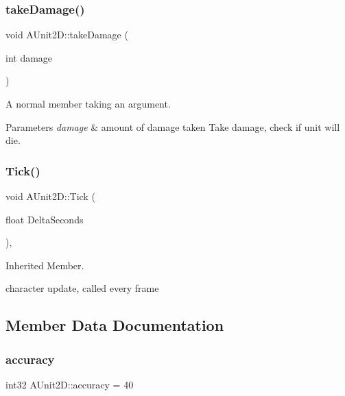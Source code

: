 \subsubsection{\texorpdfstring{take\+Damage()}{takeDamage()}}
{\footnotesize\ttfamily void A\+Unit2\+D\+::take\+Damage (\begin{DoxyParamCaption}\item[{int}]{damage }\end{DoxyParamCaption})}



A normal member taking an argument. 


\begin{DoxyParams}{Parameters}
{\em damage} & amount of damage taken Take damage, check if unit will die. \\
\hline
\end{DoxyParams}
\hypertarget{class_a_unit2_d_aabcd72dc2ba9d71a56e58148382607b2}{}\label{class_a_unit2_d_aabcd72dc2ba9d71a56e58148382607b2} 
\subsubsection{\texorpdfstring{Tick()}{Tick()}}
{\footnotesize\ttfamily void A\+Unit2\+D\+::\+Tick (\begin{DoxyParamCaption}\item[{float}]{Delta\+Seconds }\end{DoxyParamCaption})\hspace{0.3cm}{\ttfamily [override]}, {\ttfamily [virtual]}}



Inherited Member. 

character update, called every frame 

\subsection{Member Data Documentation}
\hypertarget{class_a_unit2_d_a639a503e506215b11c81167154bf9bfd}{}\label{class_a_unit2_d_a639a503e506215b11c81167154bf9bfd} 
\subsubsection{\texorpdfstring{accuracy}{accuracy}}
{\footnotesize\ttfamily int32 A\+Unit2\+D\+::accuracy = 40\hspace{0.3cm}{\ttfamily [protected]}}




